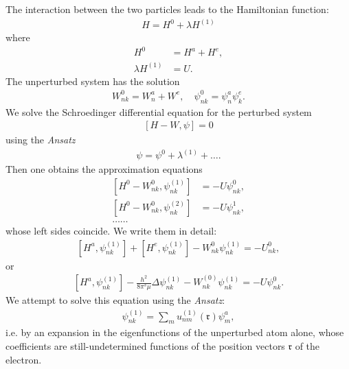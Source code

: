 \documentclass[a4paper,11pt]{article}
\newcommand{\?}[2]{#1\footnote{\textsc{Translator note}: #2}}
\newcommand{\uequ}[1]{\begin{align*}#1\end{align*}}
\begin{document}
The interaction between the two particles leads to the Hamiltonian function:
\uequ{
H = H^0 + \lambda H^{(1)}
}
where
\uequ{
H^0 &= H^a + H^e,\\
\lambda H^{(1)} &= U.
}
The unperturbed system has the solution
\uequ{
W_{nk}^0 = W_n^a + W^e, \quad \psi_{nk}^0 = \psi_n^a\psi_k^e.
}
We solve the Schroedinger differential equation for the perturbed system
\uequ{
\left[H-W,\psi\right] = 0
}
using the \textit{Ansatz}
\uequ{
\psi = \psi^0 + \lambda^{(1)} + \dots.
}
Then one obtains the approximation equations
\uequ{
\left[H^0 - W_{nk}^0, \psi_{nk}^{(1)}\right] &= -U\psi_{nk}^0,\\
\left[H^0 - W_{nk}^0, \psi_{nk}^{(2)}\right] &= -U\psi_{nk}^1,\\
\dots \dots
}
whose left sides coincide. We write them in detail:
\uequ{
\left[H^a,\psi_{nk}^{(1)}\right] + \left[H^e,\psi_{nk}^{(1)}\right]
 - W_{nk}^0 \psi_{nk}^{(1)} = -U_{nk}^0,
}
or
\uequ{
\left[H^a,\psi_{nk}^{(1)}\right] - \frac{h^2}{8\pi^s\mu}\Delta\psi_{nk}^{(1)}
 - W_{nk}^{(0)}\psi_{nk}^{(1)} = -U\psi_{nk}^0.
}
We attempt to solve this equation using the \textit{Ansatz}:
\uequ{
\psi_{nk}^{(1)} = \sum\limits_m u_{nm}^{(1)}(\mathfrak{r})\psi_m^a,
}
i.e. by an expansion in the eigenfunctions of the unperturbed atom alone, whose coefficients are still-undetermined functions of the position vectors $\mathfrak{r}$ of the electron.
\end{document}
